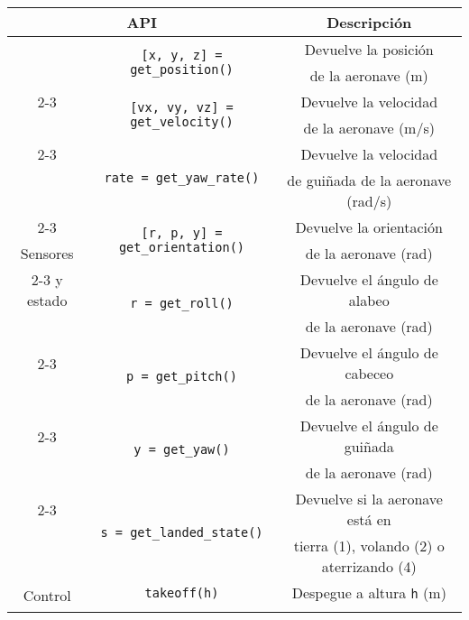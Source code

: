 \documentclass[../main.tex]{subfiles}
\begin{document}
\begin{table}[H]
	{\begin{tabular}{|c|c|c|}
		\hline
		\multicolumn{2}{|c|}{\textbf{API}} & \textbf{Descripción} \\
		\hline
		 & \multirow{2}{*}{\lstinline{[x, y, z] = get_position()}} & Devuelve la posición \\
		                                                         & & de la aeronave (m) \\
		\cline{2-3}
		 & \multirow{2}{*}{\lstinline{[vx, vy, vz] = get_velocity()}} & Devuelve la velocidad \\
		                                                            & & de la aeronave (m/s) \\
		\cline{2-3}
		 & \multirow{2}{*}{\lstinline{rate = get_yaw_rate()}} & Devuelve la velocidad \\
		                                                   &  & de guiñada de la aeronave (rad/s) \\
		\cline{2-3}
		 & \multirow{2}{*}{\lstinline{[r, p, y] = get_orientation()}} & Devuelve la orientación \\
		Sensores &                                                    & de la aeronave (rad) \\
		\cline{2-3}
		y estado & \multirow{2}{*}{\lstinline{r = get_roll()}} & Devuelve el ángulo de alabeo \\
		                                                    &  & de la aeronave (rad) \\
		\cline{2-3}
		 & \multirow{2}{*}{\lstinline{p = get_pitch()}} & Devuelve el ángulo de cabeceo \\
		                                              & & de la aeronave (rad)  \\
		\cline{2-3}
		 & \multirow{2}{*}{\lstinline{y = get_yaw()}} & Devuelve el ángulo de guiñada \\
		                                            & & de la aeronave (rad) \\
		\cline{2-3}
		 & \multirow{2}{*}{\lstinline{s = get_landed_state()}} & Devuelve si la aeronave está en \\
		                                            & & tierra (1), volando (2) o aterrizando (4) \\
		\hline
		\multirow{8}{*}{Control} & \lstinline{takeoff(h)} & Despegue a altura \lstinline{h} (m) \\
		\cline{2-3}

\end{tabular}}
\end{table}
\end{document}
